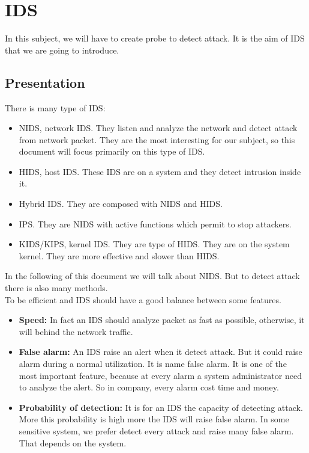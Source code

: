 \chapter{IDS}

In this subject, we will have to create probe to detect attack. It is the aim of IDS that we are going to introduce.

\section{Presentation}




There is many type of IDS:
\begin{itemize}[itemsep=0pt]
\item NIDS, network IDS. They listen and analyze the network and detect attack from network packet. They are the
  most interesting for our subject, so this document will focus primarily on this type of IDS.
\item HIDS, host IDS. These IDS are on a system and they detect intrusion inside it.
\item Hybrid IDS. They are composed with NIDS and HIDS.
\item IPS. They are NIDS with active functions which permit to stop attackers.
\item KIDS/KIPS, kernel IDS. They are type of HIDS. They are on the system kernel. They are more effective and
slower than HIDS.
\end{itemize}

In the following of this document we will talk about NIDS. But to detect attack there is also many methods.
~\\


To be efficient and IDS should have a good balance between some features.
\begin{itemize}[itemsep=0pt]
\item \textbf{Speed:} In fact an IDS should analyze packet as fast as possible, otherwise, it will behind the network
  traffic.
\item \textbf{False alarm:} An IDS raise an alert when it detect attack. But it could raise alarm during a normal
  utilization. It is name false alarm. It is one of the most important feature, because at every alarm a system
  administrator need to analyze the alert. So in company, every alarm cost time and money.
\item \textbf{Probability of detection:} It is for an IDS the capacity of detecting attack. More this probability is high
  more the IDS will raise false alarm. In some sensitive system, we prefer detect every attack and raise many
  false alarm. That depends on the system.
\end{itemize}



